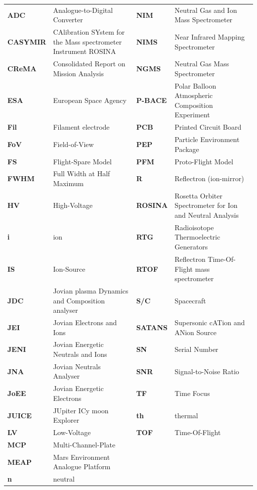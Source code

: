 \documentclass[a4paper, 12pt, abstracton]{scrartcl}
\begin{document}
	\begin{small}
	\begin{longtable}{>{\bfseries}m{2cm}|m{5cm}|>{\bfseries}m{2cm}|m{5cm}}
		ADC		& Analogue-to-Digital Converter & NIM & Neutral Gas and Ion Mass Spectrometer \\
		CASYMIR	& CAlibration SYstem for the Mass spectrometer In\-stru\-ment ROSINA & NIMS	& Near Infrared Mapping Spectrometer\\
		CReMA	& Consolidated Report on Mission Analysis & NGMS & Neutral Gas Mass Spectrometer \\
		ESA		& European Space Agency & P-BACE	& Polar Balloon Atmospheric Composition Experiment \\
		Fil		& Filament electrode & PCB		& Printed Circuit Board \\
		FoV		& Field-of-View & PEP   	& Particle Environment Package \\
		FS		& Flight-Spare Model & PFM		& Proto-Flight Model \\
		FWHM  	& Full Width at Half Maximum & R		& Reflectron (ion-mirror) \\ 
		HV		& High-Voltage & ROSINA	& Rosetta Orbiter Spectrometer for Ion and Neutral Analysis\\
		i		& ion & RTG		& Radioisotope Thermoelectric Generators\\
		IS		& Ion-Source & RTOF	& Reflectron Time-Of-Flight mass spectrometer\\
		JDC		& Jovian plasma Dynamics and Composition analyser & S/C		& Spacecraft \\
		JEI		& Jovian Electrons and Ions & SATANS	& Supersonic cATion and ANion Source \\
		JENI	& Jovian Energetic Neutrals and Ions & SN		& Serial Number \\
		JNA		& Jovian Neutrals Analyser & SNR		& Signal-to-Noise Ratio \\
		JoEE	& Jovian Energetic Electrons & 	TF		& Time Focus \\
		JUICE 	& JUpiter ICy moon Explorer & th		& thermal \\ 
		LV 		& Low-Voltage & TOF		& Time-Of-Flight \\
		MCP		& Multi-Channel-Plate & &\\
		MEAP	& Mars Environment Analogue Platform & & \\
		n		& neutral & & \\
	\end{longtable}
	\end{small}
	\newpage
	\thispagestyle{empty}
	\null
	\newpage
	
\end{document}
